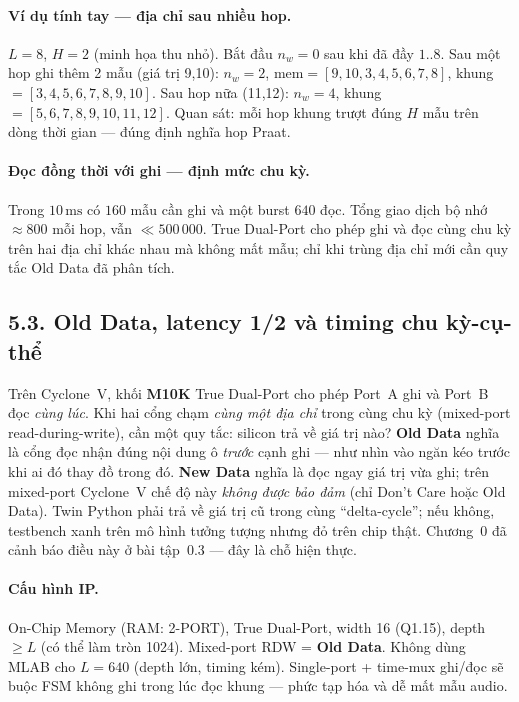 \paragraph{Ví dụ tính tay --- địa chỉ sau nhiều hop.} $L=8$, $H=2$ (minh họa thu nhỏ). Bắt đầu $n_w=0$ sau khi đã đầy $1..8$. Sau một hop ghi thêm 2 mẫu (giá trị 9,10): $n_w=2$, mem$=[9,10,3,4,5,6,7,8]$, khung $=[3,4,5,6,7,8,9,10]$. Sau hop nữa (11,12): $n_w=4$, khung $=[5,6,7,8,9,10,11,12]$. Quan sát: mỗi hop khung trượt đúng $H$ mẫu trên dòng thời gian --- đúng định nghĩa hop Praat.

\paragraph{Đọc đồng thời với ghi --- định mức chu kỳ.} Trong $10\,\text{ms}$ có $160$ mẫu cần ghi và một burst $640$ đọc. Tổng giao dịch bộ nhớ $\approx 800$ mỗi hop, vẫn $\ll 500\,000$. True Dual-Port cho phép ghi và đọc cùng chu kỳ trên hai địa chỉ khác nhau mà không mất mẫu; chỉ khi trùng địa chỉ mới cần quy tắc Old Data đã phân tích.

\subsection*{5.3. Old Data, latency 1/2 và timing chu kỳ-cụ-thể}

Trên Cyclone~V, khối \textbf{M10K} True Dual-Port cho phép Port~A ghi và Port~B đọc \emph{cùng lúc}. Khi hai cổng chạm \emph{cùng một địa chỉ} trong cùng chu kỳ (mixed-port read-during-write), cần một quy tắc: silicon trả về giá trị nào? \textbf{Old Data} nghĩa là cổng đọc nhận đúng nội dung ô \emph{trước} cạnh ghi --- như nhìn vào ngăn kéo trước khi ai đó thay đồ trong đó. \textbf{New Data} nghĩa là đọc ngay giá trị vừa ghi; trên mixed-port Cyclone~V chế độ này \emph{không được bảo đảm} (chỉ Don't Care hoặc Old Data). Twin Python phải trả về giá trị cũ trong cùng ``delta-cycle''; nếu không, testbench xanh trên mô hình tưởng tượng nhưng đỏ trên chip thật. Chương~0 đã cảnh báo điều này ở bài tập~0.3 --- đây là chỗ hiện thực.

\paragraph{Cấu hình IP.} On-Chip Memory (RAM: 2-PORT), True Dual-Port, width 16 (Q1.15), depth $\ge L$ (có thể làm tròn 1024). Mixed-port RDW = \textbf{Old Data}. Không dùng MLAB cho $L=640$ (depth lớn, timing kém). Single-port + time-mux ghi/đọc sẽ buộc FSM không ghi trong lúc đọc khung --- phức tạp hóa và dễ mất mẫu audio.

